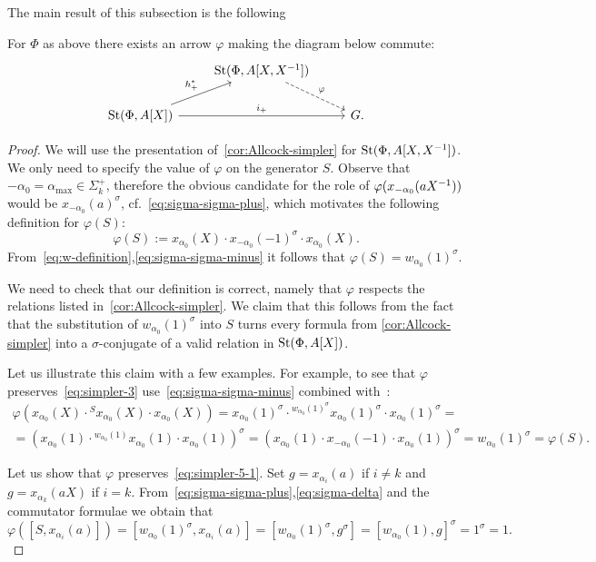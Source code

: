 The main result of this subsection is the following
\begin{prop} \label{prop:rel-poly-Laurent}
    For $\Phi$ as above there exists an arrow $\varphi$ making the diagram below commute:
    \[\begin{tikzcd} & \St(\Phi, A[X, X\inv]) \arrow[rd, dashrightarrow, "\varphi"] & \\
    \St(\Phi, A[X]) \arrow{ru}{h_+^*} \arrow{rr}{i_+} & & G.
    \end{tikzcd}\]
\end{prop}
\begin{proof}
 We will use the presentation of~\cref{cor:Allcock-simpler} for $\operatorname{St}(\Phi, A[X, X^{-1}])$.
 We only need to specify the value of $\varphi$ on the generator $S$.
 Observe that $-\alpha_0 = \alpha_{\max} \in \Sigma_k^+$, therefore the obvious candidate for the role of $\varphi(x_{-\alpha_0}(aX^{-1}))$ would be $x_{-\alpha_0}(a)^\sigma$, cf.~\eqref{eq:sigma-sigma-plus},
 which motivates the following definition for $\varphi(S)$:
 \[\varphi(S) := x_{\alpha_0}(X) \cdot x_{-\alpha_0}(-1)^\sigma \cdot x_{\alpha_0}(X).\]
 From~\eqref{eq:w-definition},\eqref{eq:sigma-sigma-minus} it follows that $\varphi(S) = w_{\alpha_0}(1)^\sigma$.

 We need to check that our definition is correct, namely that $\varphi$ respects the relations listed in~\cref{cor:Allcock-simpler}.
 We claim that this follows from the fact that the substitution of $w_{\alpha_0}(1)^\sigma$ into $S$ turns every formula from \cref{cor:Allcock-simpler}
     into a $\sigma$-conjugate of a valid relation in $\operatorname{St}(\Phi, A[X])$.

 Let us illustrate this claim with a few examples.
 For example, to see that $\varphi$ preserves~\eqref{eq:simpler-3} use~\eqref{eq:sigma-sigma-minus} combined with~\cite[Lemma~5.1b]{Ma69}:
 \begin{multline*}
     \varphi(x_{\alpha_0}(X) \cdot {}^{S} x_{\alpha_0}(X) \cdot x_{\alpha_0}(X)) = x_{\alpha_0}(1)^\sigma \cdot {}^{w_{\alpha_0}(1)^\sigma} x_{\alpha_0}(1)^\sigma \cdot x_{\alpha_0}(1)^\sigma = \\
     = \left( x_{\alpha_0}(1) \cdot {}^{w_{\alpha_0}(1)} x_{\alpha_0}(1) \cdot x_{\alpha_0}(1)\right)^\sigma = \left(x_{\alpha_0}(1) \cdot x_{-\alpha_0}(-1) \cdot x_{\alpha_0}(1)\right)^\sigma = w_{\alpha_0}(1)^\sigma = \varphi(S).
 \end{multline*}

 Let us show that $\varphi$ preserves~\eqref{eq:simpler-5-1}.
 Set $g = x_{\alpha_i}(a)$ if $i \neq k$ and $g = x_{\alpha_k}(aX)$ if $i = k$.
 From~\eqref{eq:sigma-sigma-plus},\eqref{eq:sigma-delta} and the commutator formulae we obtain that
 \begin{equation*}
     \varphi([S, x_{\alpha_i}(a)]) = [w_{\alpha_0}(1)^\sigma, x_{\alpha_i}(a)] = [w_{\alpha_0}(1)^\sigma, g^\sigma] = [w_{\alpha_0}(1), g]^\sigma = 1^\sigma = 1.
 \end{equation*}


\end{proof}
